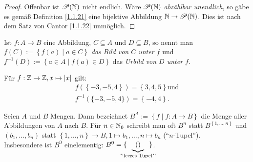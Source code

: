 \documentclass[../../main.tex]{subfiles}
\begin{document}
\begin{proof}
Offenbar ist $\mathcal P(\mathbb N)$ nicht endlich. Wäre $\mathcal P(\mathbb N)$ \emph{abzählbar unendlich}, so gäbe es gemäß Definition
\ref{1.1.21} eine bijektive Abbildung $\mathbb N\rightarrow\mathcal P(\mathbb N)$. Dies ist nach dem Satz von Cantor \ref{1.1.22} unmöglich.
\end{proof}

\begin{df}\label{1.1.25}
Ist $f: A\rightarrow B$ eine Abbildung, $C\subseteq A$ und $D\subseteq B$, so nennt man $f(C):=\left\{f(a)\mid a\in C\right\}$ \emph{das Bild von $C$ unter $f$} und $f^{-1}(D):=\left\{a\in A\mid f(a) \in D\right\}$ das \emph{Urbild von $D$ unter $f$}.
\begin{center}
\end{center}
\end{df}

\begin{bsp}\label{1.1.26}
Für $f:\mathbb Z\rightarrow\mathbb Z, x\mapsto |x|$ gilt:
\begin{align*}
f(\left\{-3,-5,4\right\}) = \left\{3,4,5\right\}\text{und}\\
f^{-1}(\{-3,-5,4\}) = \left\{-4,4\right\}.
\end{align*}
\end{bsp}

\begin{df}\label{1.1.27}
Seien $A$ und $B$ Mengen. Dann bezeichnet $B^A:=\left\{f\mid f:A\rightarrow B\right\}$ die Menge aller Abbildungen von $A$ nach $B$.
Für $n\in\mathbb N_0$ schreibt man oft $B^n$ statt $B^{\left\{1,\ldots,n\right\}}$ und $(b_1,\ldots,b_n)$ statt $\left\{1,\ldots,n\right\}\rightarrow B, 1\mapsto b_1,\ldots,n\mapsto b_n$ ("`$n$-Tupel"').\\
Insbesondere ist $B^0$ einelementig: $B^0=\{\hspace{-1em}\underbrace{()}_\text{"`leeres Tupel"'}\hspace{-1em}\}$.
\end{df}
\end{document}
